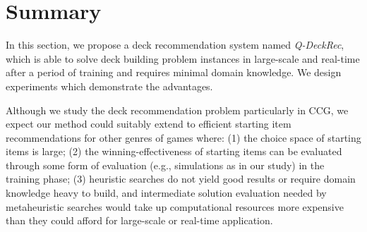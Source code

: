 

\section{Summary}\label{sec:conclusion}
In this section, we propose a deck recommendation system named \textit{Q-DeckRec}, which is able to solve deck building problem instances in large-scale and real-time after a period of training and requires minimal domain knowledge. We design experiments which demonstrate the advantages. 

Although we study the deck recommendation problem particularly in CCG, we expect our method could suitably extend to efficient starting item recommendations for other genres of games where: (1) the choice space of starting items is large; (2) the winning-effectiveness of starting items can be evaluated through some form of evaluation (e.g., simulations as in our study) in the training phase; (3) heuristic searches do not yield good results or require domain knowledge heavy to build, and intermediate solution evaluation needed by metaheuristic searches would take up computational resources more expensive than they could afford for large-scale or real-time application.
